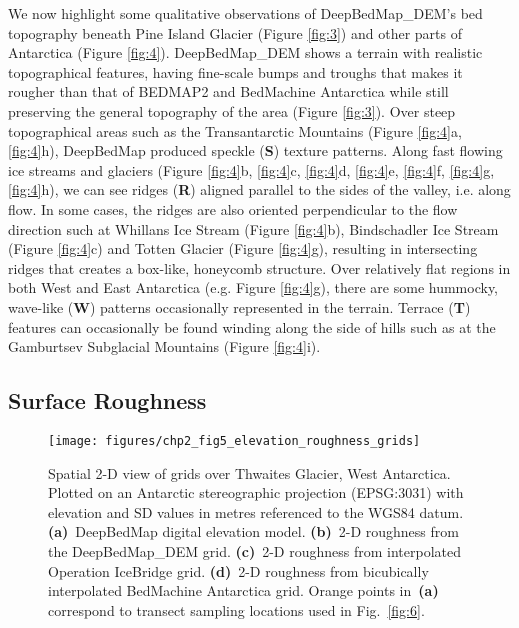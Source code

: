 We now highlight some qualitative observations of DeepBedMap\_DEM's bed topography beneath Pine Island Glacier (Figure \ref{fig:3}) and other parts of Antarctica (Figure \ref{fig:4}).
DeepBedMap\_DEM shows a terrain with realistic topographical features, having fine-scale bumps and troughs that makes it rougher than that of BEDMAP2 \citep{FretwellBedmap2improvedice2013} and BedMachine Antarctica \citep{MorlighemMEaSUREsBedMachineAntarctica2019} while still preserving the general topography of the area (Figure \ref{fig:3}).
Over steep topographical areas such as the Transantarctic Mountains (Figure \ref{fig:4}a, \ref{fig:4}h), DeepBedMap produced speckle (\textbf{S}) texture patterns.
Along fast flowing ice streams and glaciers (Figure \ref{fig:4}b, \ref{fig:4}c, \ref{fig:4}d, \ref{fig:4}e, \ref{fig:4}f, \ref{fig:4}g, \ref{fig:4}h), we can see ridges (\textbf{R}) aligned parallel to the sides of the valley, i.e. along flow.
In some cases, the ridges are also oriented perpendicular to the flow direction such at Whillans Ice Stream (Figure \ref{fig:4}b), Bindschadler Ice Stream (Figure \ref{fig:4}c) and Totten Glacier (Figure \ref{fig:4}g), resulting in intersecting ridges that creates a box-like, honeycomb structure.
Over relatively flat regions in both West and East Antarctica (e.g. Figure \ref{fig:4}g), there are some hummocky, wave-like (\textbf{W}) patterns occasionally represented in the terrain.
Terrace (\textbf{T}) features can occasionally be found winding along the side of hills such as at the Gamburtsev Subglacial Mountains (Figure \ref{fig:4}i).


\subsection{Surface Roughness} \label{section:surfaceroughness}

\begin{figure*}[t]
  \texttt{[image: figures/chp2\_fig5\_elevation\_roughness\_grids]}
  \caption[Spatial 2-D view of bed elevation and roughness grids over Thwaites Glacier]{
    Spatial 2-D view of grids over Thwaites Glacier, West Antarctica.
    Plotted on an Antarctic stereographic projection (EPSG:3031) with elevation and SD values in metres referenced to the WGS84 datum.
    \textbf{(a)}~DeepBedMap digital elevation model.
    \textbf{(b)}~2-D roughness from the DeepBedMap\_DEM grid.
    \textbf{(c)}~2-D roughness from interpolated Operation IceBridge grid.
    \textbf{(d)}~2-D roughness from bicubically interpolated BedMachine Antarctica grid.
    Orange points in~\textbf{(a)} correspond to transect sampling locations used in Fig.~\ref{fig:6}.
  }
  \label{fig:5}
\end{figure*}

